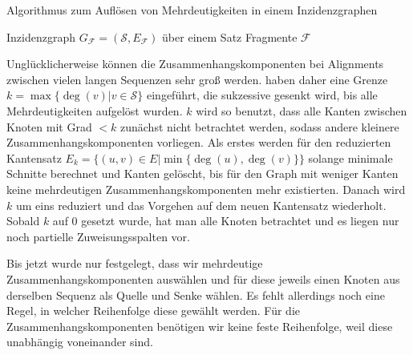 \begin{breakablealgorithm}
	\caption{Algorithmus zum Auflösen von Mehrdeutigkeiten in einem Inzidenzgraphen}
	\label{alg:amb_res}
	\begin{algorithmic}[1]
		\Require Inzidenzgraph $G_{\mathcal{F}} = (\mathcal{S},E_{\mathcal{F}})$ über einem Satz Fragmente $\mathcal{F}$
				\EndWhile
			\EndWhile
		\EndProcedure
	\end{algorithmic}
\end{breakablealgorithm}

Unglücklicherweise können die Zusammenhangskomponenten bei Alignments zwischen vielen langen Sequenzen sehr groß werden. \cite{cpm10} haben daher eine Grenze $k = \max\{\deg(v)| v \in \mathcal{S}\}$ eingeführt, die sukzessive gesenkt wird, bis alle Mehrdeutigkeiten aufgelöst wurden. $k$ wird so benutzt, dass alle Kanten zwischen Knoten mit Grad $< k$ zunächst nicht betrachtet werden, sodass andere kleinere Zusammenhangskomponenten vorliegen. Als erstes werden für den reduzierten Kantensatz $E_k = \{(u,v) \in E|\min\{\deg(u),\deg(v)\}\}$ solange minimale Schnitte berechnet und Kanten gelöscht, bis für den Graph mit weniger Kanten keine mehrdeutigen Zusammenhangskomponenten mehr existierten. Danach wird $k$ um eins reduziert und das Vorgehen auf dem neuen Kantensatz wiederholt. Sobald $k$ auf 0 gesetzt wurde, hat man alle Knoten betrachtet und es liegen nur noch partielle Zuweisungsspalten vor. 

Bis jetzt wurde nur festgelegt, dass wir mehrdeutige Zusammenhangskomponenten auswählen und für diese jeweils einen Knoten aus derselben Sequenz als Quelle und Senke wählen. Es fehlt allerdings noch eine Regel, in welcher Reihenfolge diese gewählt werden. Für die Zusammenhangskomponenten benötigen wir keine feste Reihenfolge, weil diese unabhängig voneinander sind.

